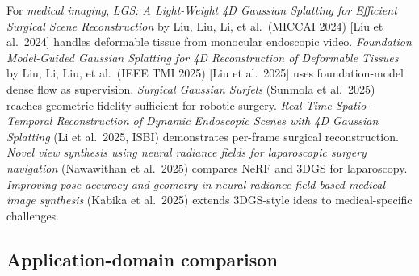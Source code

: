 For \emph{medical imaging}, \emph{LGS: A Light-Weight 4D Gaussian Splatting for Efficient Surgical Scene Reconstruction} by Liu, Liu, Li, et al.~(MICCAI 2024) {[}Liu et al.~2024{]} handles deformable tissue from monocular endoscopic video. \emph{Foundation Model-Guided Gaussian Splatting for 4D Reconstruction of Deformable Tissues} by Liu, Li, Liu, et al.~(IEEE TMI 2025) {[}Liu et al.~2025{]} uses foundation-model dense flow as supervision. \emph{Surgical Gaussian Surfels} (Sunmola et al.~2025) reaches geometric fidelity sufficient for robotic surgery. \emph{Real-Time Spatio-Temporal Reconstruction of Dynamic Endoscopic Scenes with 4D Gaussian Splatting} (Li et al.~2025, ISBI) demonstrates per-frame surgical reconstruction. \emph{Novel view synthesis using neural radiance fields for laparoscopic surgery navigation} (Nawawithan et al.~2025) compares NeRF and 3DGS for laparoscopy. \emph{Improving pose accuracy and geometry in neural radiance field-based medical image synthesis} (Kabika et al.~2025) extends 3DGS-style ideas to medical-specific challenges.

\subsection{Application-domain comparison}\label{application-domain-comparison}

